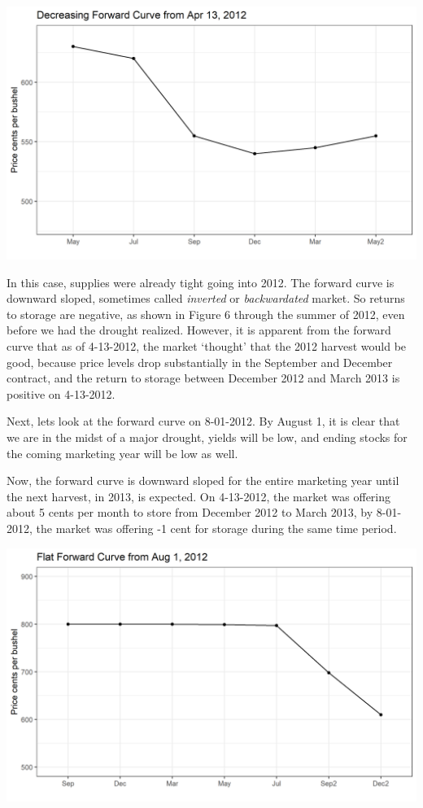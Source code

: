 \documentclass[
]{book}
\begin{document}
\includegraphics{assets/PricesSpaceTime-decreasing-4-13-2012.png}

In this case, supplies were already tight going into 2012. The forward curve is downward sloped, sometimes called \emph{inverted} or \emph{backwardated} market. So returns to storage are negative, as shown in Figure 6 through the summer of 2012, even before we had the drought realized. However, it is apparent from the forward curve that as of 4-13-2012, the market `thought' that the 2012 harvest would be good, because price levels drop substantially in the September and December contract, and the return to storage between December 2012 and March 2013 is positive on 4-13-2012.

Next, lets look at the forward curve on 8-01-2012. By August 1, it is clear that we are in the midst of a major drought, yields will be low, and ending stocks for the coming marketing year will be low as well.

Now, the forward curve is downward sloped for the entire marketing year until the next harvest, in 2013, is expected. On 4-13-2012, the market was offering about 5 cents per month to store from December 2012 to March 2013, by 8-01-2012, the market was offering -1 cent for storage during the same time period.

\includegraphics{assets/PricesSpaceTime-flat-8-01-2012.png}
\end{document}
